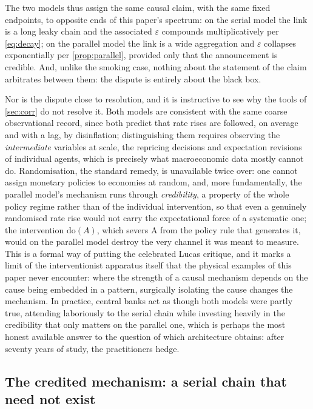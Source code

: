\documentclass[11pt]{article}
\theoremstyle{definition}
\newcommand{\eps}{\varepsilon}
\begin{document}
The two models thus assign the same causal claim, with the same fixed endpoints, to opposite ends of this paper's spectrum: on the serial model the link is a long leaky chain and the associated $\eps$ compounds multiplicatively per \cref{eq:decay}; on the parallel model the link is a wide aggregation and $\eps$ collapses exponentially per \cref{prop:parallel}, provided only that the announcement is credible. And, unlike the smoking case, nothing about the statement of the claim arbitrates between them: the dispute is entirely about the black box.

Nor is the dispute close to resolution, and it is instructive to see why the tools of \cref{sec:corr} do not resolve it. Both models are consistent with the same coarse observational record, since both predict that rate rises are followed, on average and with a lag, by disinflation; distinguishing them requires observing the \emph{intermediate} variables at scale, the repricing decisions and expectation revisions of individual agents, which is precisely what macroeconomic data mostly cannot do. Randomisation, the standard remedy, is unavailable twice over: one cannot assign monetary policies to economies at random, and, more fundamentally, the parallel model's mechanism runs through \emph{credibility}, a property of the whole policy regime rather than of the individual intervention, so that even a genuinely randomised rate rise would not carry the expectational force of a systematic one; the intervention $\mathrm{do}(A)$, which severs A from the policy rule that generates it, would on the parallel model destroy the very channel it was meant to measure. This is a formal way of putting the celebrated Lucas critique, and it marks a limit of the interventionist apparatus itself that the physical examples of this paper never encounter: where the strength of a causal mechanism depends on the cause being embedded in a pattern, surgically isolating the cause changes the mechanism. In practice, central banks act as though both models were partly true, attending laboriously to the serial chain while investing heavily in the credibility that only matters on the parallel one, which is perhaps the most honest available answer to the question of which architecture obtains: after seventy years of study, the practitioners hedge.

\subsection{The credited mechanism: a serial chain that need not exist}
\label{subsec:credited}
\end{document}
